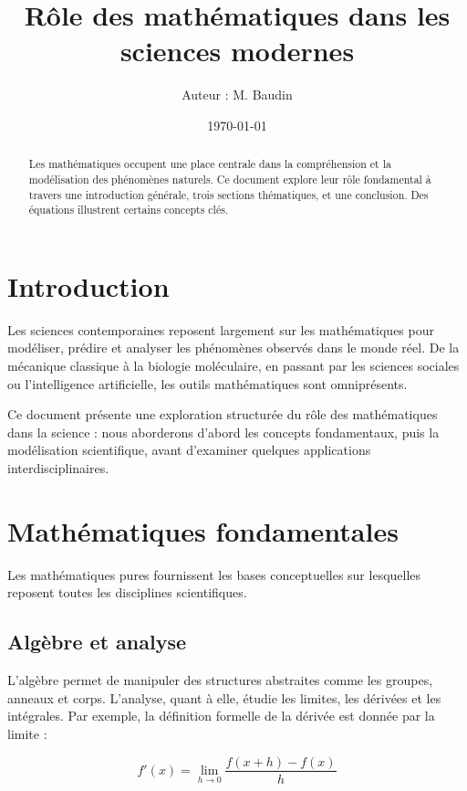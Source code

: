 \documentclass[11pt,a4paper]{article}
\title{Rôle des mathématiques dans les sciences modernes}
\author{Auteur : M. Baudin}
\date{\today}
\begin{document}
\maketitle

\begin{abstract}
Les mathématiques occupent une place centrale dans la compréhension et la modélisation des phénomènes naturels. Ce document explore leur rôle fondamental à travers une introduction générale, trois sections thématiques, et une conclusion. Des équations illustrent certains concepts clés.
\end{abstract}

\section*{Introduction}

Les sciences contemporaines reposent largement sur les mathématiques pour modéliser, prédire et analyser les phénomènes observés dans le monde réel. De la mécanique classique à la biologie moléculaire, en passant par les sciences sociales ou l'intelligence artificielle, les outils mathématiques sont omniprésents.

Ce document présente une exploration structurée du rôle des mathématiques dans la science : nous aborderons d'abord les concepts fondamentaux, puis la modélisation scientifique, avant d'examiner quelques applications interdisciplinaires. 

\section{Mathématiques fondamentales}

Les mathématiques pures fournissent les bases conceptuelles sur lesquelles reposent toutes les disciplines scientifiques.

\subsection*{Algèbre et analyse}

L'algèbre permet de manipuler des structures abstraites comme les groupes, anneaux et corps. L’analyse, quant à elle, étudie les limites, les dérivées et les intégrales. Par exemple, la définition formelle de la dérivée est donnée par la limite :

\begin{equation}
f'(x) = \lim_{h \to 0} \frac{f(x+h) - f(x)}{h}
\end{equation}
\end{document}
